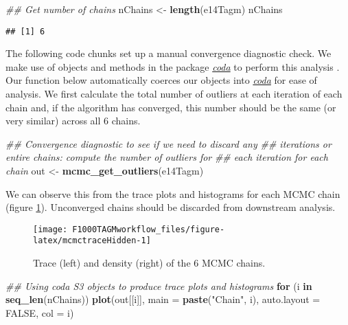 \documentclass[9pt,a4paper,]{extarticle}
\newenvironment{Shaded}{\begin{snugshade}}{\end{snugshade}}
\newcommand{\CommentTok}[1]{\textcolor[rgb]{0.56,0.35,0.01}{\textit{#1}}}
\newcommand{\ControlFlowTok}[1]{\textcolor[rgb]{0.13,0.29,0.53}{\textbf{#1}}}
\newcommand{\DataTypeTok}[1]{\textcolor[rgb]{0.13,0.29,0.53}{#1}}
\newcommand{\KeywordTok}[1]{\textcolor[rgb]{0.13,0.29,0.53}{\textbf{#1}}}
\newcommand{\NormalTok}[1]{#1}
\newcommand{\OtherTok}[1]{\textcolor[rgb]{0.56,0.35,0.01}{#1}}
\newcommand{\StringTok}[1]{\textcolor[rgb]{0.31,0.60,0.02}{#1}}
\begin{document}
\begin{Shaded}
\begin{Highlighting}[]
\CommentTok{## Get number of chains}
\NormalTok{nChains <-}\StringTok{ }\KeywordTok{length}\NormalTok{(e14Tagm)}
\NormalTok{nChains}
\end{Highlighting}
\end{Shaded}

\begin{verbatim}
## [1] 6
\end{verbatim}

The following code chunks set up a manual convergence diagnostic
check. We make use of objects and methods in the package
\emph{\href{https://CRAN.R-project.org/package=coda}{coda}} to perform this
analysis \citep{coda}. Our function below automatically coerces our
objects into \emph{\href{https://CRAN.R-project.org/package=coda}{coda}} for
ease of analysis. We first calculate the total number of outliers at
each iteration of each chain and, if the algorithm has converged, this
number should be the same (or very similar) across all 6 chains.

\begin{Shaded}
\begin{Highlighting}[]
\CommentTok{## Convergence diagnostic to see if we need to discard any}
\CommentTok{## iterations or entire chains: compute the number of outliers for}
\CommentTok{## each iteration for each chain}
\NormalTok{out <-}\StringTok{ }\KeywordTok{mcmc_get_outliers}\NormalTok{(e14Tagm)}
\end{Highlighting}
\end{Shaded}

We can observe this from the trace plots and histograms for each MCMC
chain (figure \ref{fig:mcmctraceHidden}). Unconverged chains should be
discarded from downstream analysis.

\begin{figure}

{\centering \texttt{[image: F1000TAGMworkflow\_files/figure-latex/mcmctraceHidden-1]} 

}

\caption{Trace (left) and density (right) of the 6 MCMC chains.}\label{fig:mcmctraceHidden}
\end{figure}

\begin{Shaded}
\begin{Highlighting}[]
\CommentTok{## Using coda S3 objects to produce trace plots and histograms}
\ControlFlowTok{for}\NormalTok{ (i }\ControlFlowTok{in} \KeywordTok{seq_len}\NormalTok{(nChains))}
    \KeywordTok{plot}\NormalTok{(out[[i]], }\DataTypeTok{main =} \KeywordTok{paste}\NormalTok{(}\StringTok{"Chain"}\NormalTok{, i), }\DataTypeTok{auto.layout =} \OtherTok{FALSE}\NormalTok{, }\DataTypeTok{col =}\NormalTok{ i)}
\end{Highlighting}
\end{Shaded}
\end{document}
